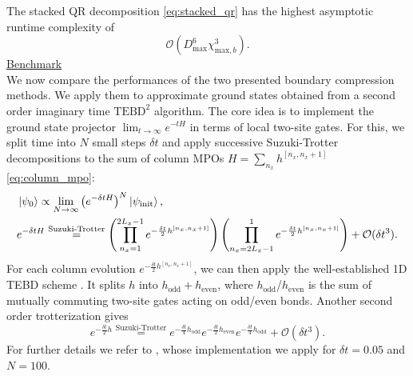 \noindent The stacked QR decomposition \eqref{eq:stacked_qr} has the highest asymptotic runtime complexity of 
\begin{equation}
	\mathcal{O}( D_{\text{max}}^6 \chi_{\text{max}, b}^3 ).
\end{equation}
\noindent \underline{Benchmark} \\[0.5em]
\noindent We now compare the performances of the two presented boundary compression methods. We apply them to approximate ground states obtained from a second order imaginary time $\text{TEBD}^2$ algorithm. The core idea is to implement the ground state projector $\lim_{t \to \infty} e^{-t H}$ in terms of local two-site gates. For this, we split time into $N$ small steps $\delta t$ and apply successive Suzuki-Trotter decompositions to the sum of column MPOs $H = \sum_{n_x} h^{[n_x, n_x +1]}$ \eqref{eq:column_mpo}:
\begin{align}
	&\ket{\psi_0} \propto \lim_{N \to \infty} \left( e^{-\delta t H} \right)^N \ket{\psi_{\text{init}}}, \\
	&e^{-\delta t H} \overset{\text{Suzuki-Trotter}}{=} \left( \prod_{n_x=1}^{2L_x-1} e^{-\frac{\delta t}{2} h^{[n_x, n_x +1]}} \right) \left( \prod_{n_x = 2L_x-1}^1 e^{-\frac{\delta t}{2} h^{[n_x, n_x +1]}} \right)+ \mathcal{O}(\delta t^3).
\end{align}
For each column evolution $e^{-\frac{\delta t}{2} h^{[n_x, n_x +1]}}$, we can then apply the well-established 1D TEBD scheme \cite{vidal2004efficient}. It splits $h$ into $h_{\text{odd}} + h_{\text{even}}$, where $h_{\text{odd}}$/$h_{\text{even}}$ is the sum of mutually commuting two-site gates acting on odd/even bonds. Another second order trotterization gives 
\begin{equation}
	e^{-\frac{\delta t}{2} h} \overset{\text{Suzuki-Trotter}}{=} e^{-\frac{\delta t}{4} h_{\text{odd}}} e^{-\frac{\delta t}{2} h_{\text{even}}} e^{-\frac{\delta t}{4} h_{\text{odd}}}+ \mathcal{O}(\delta t^3). 
\end{equation}
For further details we refer to \cite{sappler2024diagonal}, whose implementation we apply for $\delta t = 0.05$ and $N = 100$. \\


